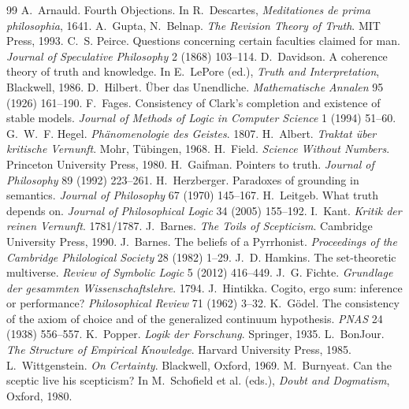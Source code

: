 \documentclass[11pt,a4paper]{article}
\begin{document}
\begin{thebibliography}{99}\small
{} A.~Arnauld. Fourth Objections. In R.~Descartes, \emph{Meditationes de prima philosophia}, 1641.
 A.~Gupta, N.~Belnap. \emph{The Revision Theory of Truth}. MIT Press, 1993.
 C.~S. Peirce. Questions concerning certain faculties claimed for man. \emph{Journal of
  Speculative Philosophy} 2 (1868) 103--114.
 D.~Davidson. A coherence theory of truth and knowledge. In E.~LePore (ed.), \emph{Truth and
  Interpretation}, Blackwell, 1986.
 D.~Hilbert. Über das Unendliche. \emph{Mathematische Annalen} 95 (1926) 161--190.
 F.~Fages. Consistency of Clark's completion and existence of stable models. \emph{Journal of Methods of
  Logic in Computer Science} 1 (1994) 51--60.
 G.~W.~F. Hegel. \emph{Phänomenologie des Geistes}. 1807.
 H.~Albert. \emph{Traktat über kritische Vernunft}. Mohr, Tübingen, 1968.
 H.~Field. \emph{Science Without Numbers}. Princeton University Press, 1980.
 H.~Gaifman. Pointers to truth. \emph{Journal of Philosophy} 89 (1992) 223--261.
 H.~Herzberger. Paradoxes of grounding in semantics. \emph{Journal of Philosophy} 67 (1970) 145--167.
 H.~Leitgeb. What truth depends on. \emph{Journal of Philosophical Logic} 34 (2005) 155--192.
 I.~Kant. \emph{Kritik der reinen Vernunft}. 1781/1787.
 J.~Barnes. \emph{The Toils of Scepticism}. Cambridge University Press, 1990.
 J.~Barnes. The beliefs of a Pyrrhonist. \emph{Proceedings of the Cambridge Philological Society} 28 (1982) 1--29.
 J.~D. Hamkins. The set-theoretic multiverse. \emph{Review of Symbolic Logic} 5 (2012) 416--449.
 J.~G. Fichte. \emph{Grundlage der gesammten Wissenschaftslehre}. 1794.
 J.~Hintikka. Cogito, ergo sum: inference or performance? \emph{Philosophical Review} 71 (1962) 3--32.
 K.~Gödel. The consistency of the axiom of choice and of the generalized continuum hypothesis.
  \emph{PNAS} 24 (1938) 556--557.
 K.~Popper. \emph{Logik der Forschung}. Springer, 1935.
 L.~BonJour. \emph{The Structure of Empirical Knowledge}. Harvard University Press, 1985.
 L.~Wittgenstein. \emph{On Certainty}. Blackwell, Oxford, 1969.
 M.~Burnyeat. Can the sceptic live his scepticism? In M.~Schofield et al. (eds.), \emph{Doubt and
  Dogmatism}, Oxford, 1980.

\end{thebibliography}
\end{document}
